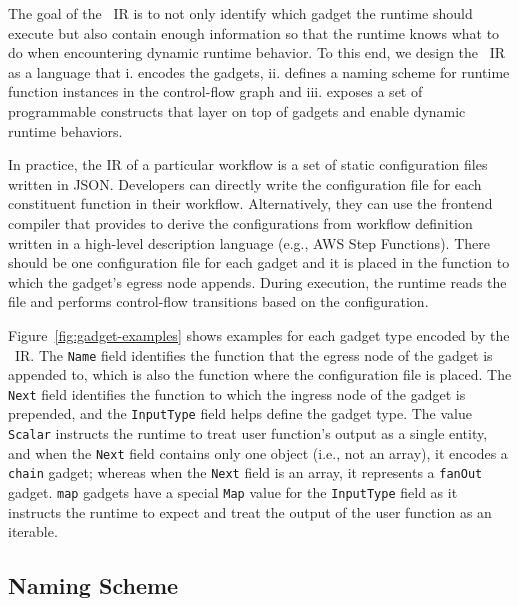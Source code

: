The goal of the \name{}~IR is to not only identify which gadget the \name{}
runtime should execute but also contain enough information so that the \name{}
runtime knows what to do when encountering dynamic runtime behavior. To this
end, we design the \name{}~IR as a language that i. encodes the gadgets, ii.
defines a naming scheme for runtime function instances in the control-flow
graph and iii. exposes a set of programmable constructs that layer on top of
gadgets and enable dynamic runtime behaviors.

In practice, the IR of a particular workflow is a set of static configuration
files written in JSON. Developers can directly write the configuration file
for each constituent function in their workflow. Alternatively, they can use
the frontend compiler that \name{} provides to derive the configurations from
workflow definition written in a high-level description language (e.g., AWS
Step Functions). There should be one configuration file for each gadget and it
is placed in the function to which the gadget's egress node appends. During
execution, the \name{} runtime reads the file and performs control-flow
transitions based on the configuration.


Figure~\ref{fig:gadget-examples} shows examples for each gadget type encoded
by the \name{}~IR. The \texttt{Name} field identifies the function that the
egress node of the gadget is appended to, which is also the function where the
configuration file is placed. The \texttt{Next} field identifies the function
to which the ingress node of the gadget is prepended, and the
\texttt{InputType} field helps define the gadget type. The value
\texttt{Scalar} instructs the runtime to treat user function's output as a
single entity, and when the \texttt{Next} field contains only one object
(i.e., not an array), it encodes a \texttt{chain} gadget; whereas when the
\texttt{Next} field is an array, it represents a \texttt{fanOut} gadget.
\texttt{map} gadgets have a special \texttt{Map} value for the
\texttt{InputType} field as it instructs the runtime to expect and treat the
output of the user function as an iterable.

\subsection{Naming Scheme}\label{sec:ir:naming}

